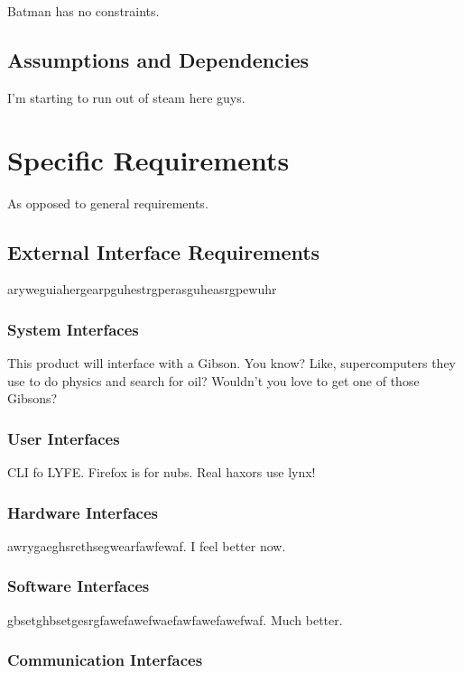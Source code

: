 \documentclass{scrreprt}
\begin{document}
Batman has no constraints.

\section{Assumptions and Dependencies}

I'm starting to run out of steam here guys.

\chapter{Specific Requirements}

As opposed to general requirements.

\section{External Interface Requirements}

aryweguiahergearpguhestrgperasguheasrgpewuhr

\subsection{System Interfaces}

This product will interface with a Gibson. You know? Like, supercomputers 
they use to do physics and search for oil? Wouldn't you love to get one of 
those Gibsons?

\subsection{User Interfaces}

CLI fo LYFE. Firefox is for nubs. Real haxors use lynx!

\subsection{Hardware Interfaces}

awrygaeghsrethsegwearfawfewaf. I feel better now.

\subsection{Software Interfaces}

gbsetghbsetgesrgfawefawefwaefawfawefawefwaf. Much better.

\subsection{Communication Interfaces}
\end{document}
